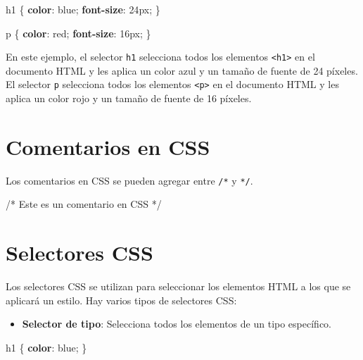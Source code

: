 \documentclass[
  a4paper,
  DIV=11,
  numbers=noendperiod,
  onepage,
  openany]{scrreprt}
\newenvironment{Shaded}{\begin{snugshade}}{\end{snugshade}}
\newcommand{\CharTok}[1]{\textcolor[rgb]{0.13,0.47,0.30}{#1}}
\newcommand{\CommentTok}[1]{\textcolor[rgb]{0.37,0.37,0.37}{#1}}
\newcommand{\ConstantTok}[1]{\textcolor[rgb]{0.56,0.35,0.01}{#1}}
\newcommand{\DataTypeTok}[1]{\textcolor[rgb]{0.68,0.00,0.00}{#1}}
\newcommand{\DecValTok}[1]{\textcolor[rgb]{0.68,0.00,0.00}{#1}}
\newcommand{\KeywordTok}[1]{\textcolor[rgb]{0.00,0.23,0.31}{\textbf{#1}}}
\newcommand{\NormalTok}[1]{\textcolor[rgb]{0.00,0.23,0.31}{#1}}
\newcommand{\OperatorTok}[1]{\textcolor[rgb]{0.37,0.37,0.37}{#1}}
\providecommand{\tightlist}{%
  \setlength{\itemsep}{0pt}\setlength{\parskip}{0pt}}\usepackage{longtable,booktabs,array}
\begin{document}
\begin{tcolorbox}
\begin{Shaded}
\begin{Highlighting}[]
\NormalTok{h1 \{}
  \KeywordTok{color}\CharTok{:} \ConstantTok{blue}\OperatorTok{;}
  \KeywordTok{font{-}size}\CharTok{:} \DecValTok{24}\DataTypeTok{px}\OperatorTok{;}
\NormalTok{\}}

\NormalTok{p \{}
  \KeywordTok{color}\CharTok{:} \ConstantTok{red}\OperatorTok{;}
  \KeywordTok{font{-}size}\CharTok{:} \DecValTok{16}\DataTypeTok{px}\OperatorTok{;}
\NormalTok{\}}
\end{Highlighting}
\end{Shaded}

En este ejemplo, el selector \texttt{h1} selecciona todos los elementos
\texttt{\textless{}h1\textgreater{}} en el documento HTML y les aplica
un color azul y un tamaño de fuente de 24 píxeles. El selector
\texttt{p} selecciona todos los elementos
\texttt{\textless{}p\textgreater{}} en el documento HTML y les aplica un
color rojo y un tamaño de fuente de 16 píxeles.

\section{Comentarios en CSS}\label{comentarios-en-css}

Los comentarios en CSS se pueden agregar entre \texttt{/*} y
\texttt{*/}.

\begin{Shaded}
\begin{Highlighting}[]
\CommentTok{/* Este es un comentario en CSS */}
\end{Highlighting}
\end{Shaded}

\section{Selectores CSS}\label{selectores-css}

Los selectores CSS se utilizan para seleccionar los elementos HTML a los
que se aplicará un estilo. Hay varios tipos de selectores CSS:

\begin{itemize}
\tightlist
\item
  \textbf{Selector de tipo}: Selecciona todos los elementos de un tipo
  específico.
\end{itemize}

\begin{Shaded}
\begin{Highlighting}[]
\NormalTok{h1 \{}
  \KeywordTok{color}\CharTok{:} \ConstantTok{blue}\OperatorTok{;}
\NormalTok{\}}
\end{Highlighting}
\end{Shaded}


\end{tcolorbox}
\end{document}
